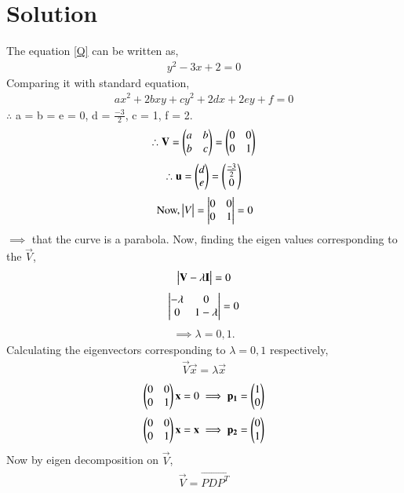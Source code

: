 \documentclass[journal,12pt,twocolumn]{IEEEtran}
\begin{document}
\section{Solution}
The equation \eqref{Q} can be written as,
\begin{align}
y^2-3x+2 = 0
\end{align}
Comparing it with standard equation,
\begin{align}
ax^2+2bxy+cy^2+2dx+2ey+f = 0
\end{align}
$\therefore$ a = b = e = 0, d = $\frac{-3}{2}$, c = 1, f = 2.
\begin{align}
\therefore \mathbf{V} = \begin{pmatrix}a&b\\b&c\end{pmatrix} = \begin{pmatrix}0&0\\0&1\end{pmatrix}
\end{align} 
\begin{align}
\therefore\mathbf{u} = \begin{pmatrix}d\\e\end{pmatrix} = \begin{pmatrix}\frac{-3}{2}\\0\end{pmatrix}\label{u}
\end{align}
\begin{align}
 \mbox{ Now,} \begin{vmatrix}V\end{vmatrix} = \begin{vmatrix}0&0\\0&1\end{vmatrix} = 0
\end{align}
$\implies$ that the curve is a parabola. Now, finding the eigen values corresponding to the $\vec{V}$,
\begin{align}
\begin{vmatrix}\mathbf{V}-\lambda\mathbf{I}\end{vmatrix} = 0
\end{align}
\begin{align}
\begin{vmatrix}-\lambda&0\\0&1-\lambda\end{vmatrix} = 0
\end{align}
\begin{align}
\implies \lambda = 0,1.
\end{align}
Calculating the eigenvectors corresponding to $\lambda = 0,1$ respectively,
\begin{align}
\vec{V}\vec{x} = \lambda\vec{x}
\end{align}
\begin{align}
\begin{pmatrix}0&0\\0&1\end{pmatrix}\mathbf{x} = 0 \implies \mathbf{p_1} = \begin{pmatrix}1\\0\end{pmatrix}
\end{align}
\begin{align}
\begin{pmatrix}0&0\\0&1\end{pmatrix}\mathbf{x} = \mathbf{x} \implies \mathbf{p_2} = \begin{pmatrix}0\\1\end{pmatrix}
\end{align}
Now by eigen decomposition on $\vec{V}$,
\begin{align}
\vec{V} = \vec{PDP^T}
\label{V}
\end{align}
\end{document}
